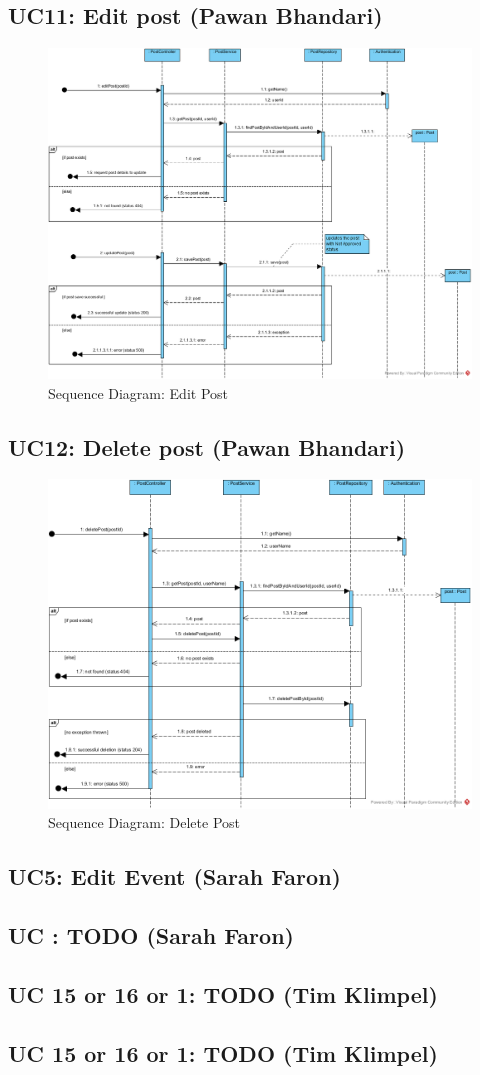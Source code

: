 \documentclass{article}
\begin{document}
\subsection{UC11: Edit post (Pawan Bhandari)}
\begin{figure}[H]
    \centering
    \includegraphics[width=.98\textwidth]{images/SD-UC11-EditPost.png}
    \centering
    \caption{Sequence Diagram: Edit Post}
\end{figure}
\subsection{UC12: Delete post (Pawan Bhandari)}
\begin{figure}[H]
    \centering
    \includegraphics[width=.98\textwidth]{images/SD-UC12-DeletePost.png}
    \centering
    \caption{Sequence Diagram: Delete Post}
\end{figure}
\subsection{UC5: Edit Event (Sarah Faron)}
\subsection{UC : TODO (Sarah Faron)}
\subsection{UC 15 or 16 or 1: TODO (Tim Klimpel)}
\subsection{UC 15 or 16 or 1: TODO (Tim Klimpel)}
\end{document}
